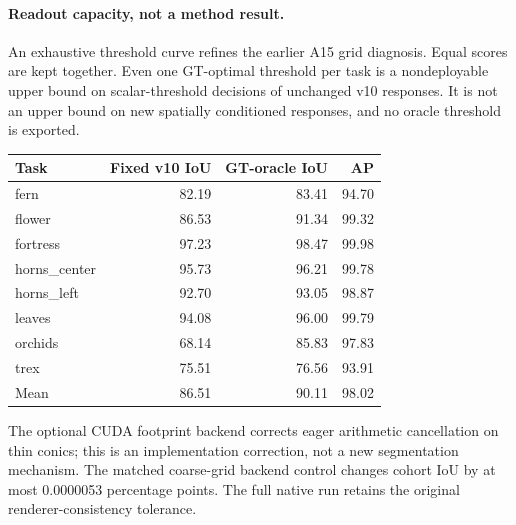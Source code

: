 \paragraph{Readout capacity, not a method result.}
An exhaustive threshold curve refines the earlier A15 grid diagnosis. Equal scores are kept together. Even one GT-optimal threshold per task is a nondeployable upper bound on scalar-threshold decisions of unchanged v10 responses. It is not an upper bound on new spatially conditioned responses, and no oracle threshold is exported.
\begin{center}\small\begin{tabular}{lrrr}\toprule
Task & Fixed v10 IoU & GT-oracle IoU & AP \\\midrule
fern & 82.19 & 83.41 & 94.70 \\
flower & 86.53 & 91.34 & 99.32 \\
fortress & 97.23 & 98.47 & 99.98 \\
horns\_center & 95.73 & 96.21 & 99.78 \\
horns\_left & 92.70 & 93.05 & 98.87 \\
leaves & 94.08 & 96.00 & 99.79 \\
orchids & 68.14 & 85.83 & 97.83 \\
trex & 75.51 & 76.56 & 93.91 \\
Mean & 86.51 & 90.11 & 98.02 \\
\bottomrule\end{tabular}\end{center}
The optional CUDA footprint backend corrects eager arithmetic cancellation on thin conics; this is an implementation correction, not a new segmentation mechanism. The matched coarse-grid backend control changes cohort IoU by at most 0.0000053 percentage points. The full native run retains the original renderer-consistency tolerance.

